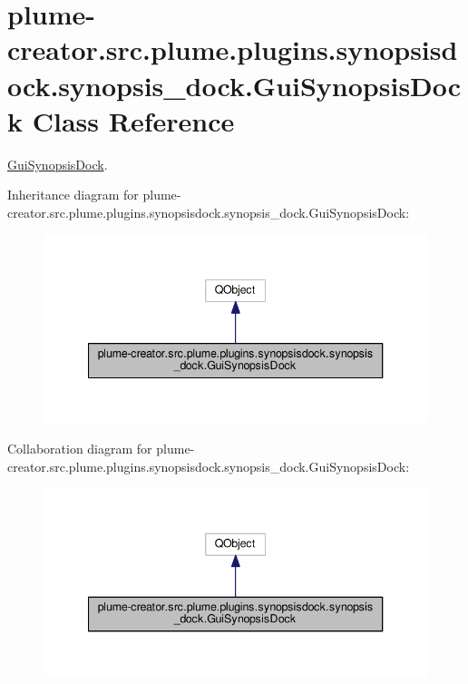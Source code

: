 \hypertarget{classplume-creator_1_1src_1_1plume_1_1plugins_1_1synopsisdock_1_1synopsis__dock_1_1_gui_synopsis_dock}{}\section{plume-\/creator.src.\+plume.\+plugins.\+synopsisdock.\+synopsis\+\_\+dock.\+Gui\+Synopsis\+Dock Class Reference}
\label{classplume-creator_1_1src_1_1plume_1_1plugins_1_1synopsisdock_1_1synopsis__dock_1_1_gui_synopsis_dock}


\hyperlink{classplume-creator_1_1src_1_1plume_1_1plugins_1_1synopsisdock_1_1synopsis__dock_1_1_gui_synopsis_dock}{Gui\+Synopsis\+Dock}.  




Inheritance diagram for plume-\/creator.src.\+plume.\+plugins.\+synopsisdock.\+synopsis\+\_\+dock.\+Gui\+Synopsis\+Dock\+:\nopagebreak
\begin{figure}[H]
\begin{center}
\leavevmode
\includegraphics[width=340pt]{classplume-creator_1_1src_1_1plume_1_1plugins_1_1synopsisdock_1_1synopsis__dock_1_1_gui_synopsis_dock__inherit__graph}
\end{center}
\end{figure}


Collaboration diagram for plume-\/creator.src.\+plume.\+plugins.\+synopsisdock.\+synopsis\+\_\+dock.\+Gui\+Synopsis\+Dock\+:\nopagebreak
\begin{figure}[H]
\begin{center}
\leavevmode
\includegraphics[width=340pt]{classplume-creator_1_1src_1_1plume_1_1plugins_1_1synopsisdock_1_1synopsis__dock_1_1_gui_synopsis_dock__coll__graph}
\end{center}
\end{figure}
